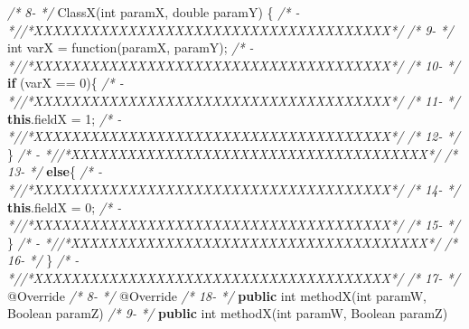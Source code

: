 \documentclass[
]{article}
\newenvironment{Shaded}{\begin{snugshade}}{\end{snugshade}}
\newcommand{\AttributeTok}[1]{\textcolor[rgb]{0.77,0.63,0.00}{#1}}
\newcommand{\BuiltInTok}[1]{#1}
\newcommand{\CommentTok}[1]{\textcolor[rgb]{0.56,0.35,0.01}{\textit{#1}}}
\newcommand{\DataTypeTok}[1]{\textcolor[rgb]{0.13,0.29,0.53}{#1}}
\newcommand{\DecValTok}[1]{\textcolor[rgb]{0.00,0.00,0.81}{#1}}
\newcommand{\FunctionTok}[1]{\textcolor[rgb]{0.00,0.00,0.00}{#1}}
\newcommand{\KeywordTok}[1]{\textcolor[rgb]{0.13,0.29,0.53}{\textbf{#1}}}
\newcommand{\NormalTok}[1]{#1}
\begin{document}
\begin{landscape}
\begin{Shaded}
\begin{Highlighting}[]
\CommentTok{/*  8-                 */}    \FunctionTok{ClassX}\NormalTok{(}\DataTypeTok{int}\NormalTok{ paramX, }\DataTypeTok{double}\NormalTok{ paramY) \{                                }\CommentTok{/*   -                 *//*XXXXXXXXXXXXXXXXXXXXXXXXXXXXXXXXXXXXXX*/}                     
\CommentTok{/*  9-                 */}        \DataTypeTok{int}\NormalTok{ varX = }\FunctionTok{function}\NormalTok{(paramX, paramY);                          }\CommentTok{/*   -                 *//*XXXXXXXXXXXXXXXXXXXXXXXXXXXXXXXXXXXXXX*/}                     
\CommentTok{/* 10-                 */}        \KeywordTok{if}\NormalTok{ (varX == }\DecValTok{0}\NormalTok{)\{                                        }\CommentTok{/*   -                 *//*XXXXXXXXXXXXXXXXXXXXXXXXXXXXXXXXXXXXXX*/}                     
\CommentTok{/* 11-                 */}            \KeywordTok{this}\NormalTok{.}\FunctionTok{fieldX}\NormalTok{ = }\DecValTok{1}\NormalTok{;                                   }\CommentTok{/*   -                 *//*XXXXXXXXXXXXXXXXXXXXXXXXXXXXXXXXXXXXXX*/}                     
\CommentTok{/* 12-                 */}\NormalTok{        \}                                                      }\CommentTok{/*   -                 *//*XXXXXXXXXXXXXXXXXXXXXXXXXXXXXXXXXXXXXX*/}                     
\CommentTok{/* 13-                 */}        \KeywordTok{else}\NormalTok{\{                                                  }\CommentTok{/*   -                 *//*XXXXXXXXXXXXXXXXXXXXXXXXXXXXXXXXXXXXXX*/}                     
\CommentTok{/* 14-                 */}            \KeywordTok{this}\NormalTok{.}\FunctionTok{fieldX}\NormalTok{ = }\DecValTok{0}\NormalTok{;                                   }\CommentTok{/*   -                 *//*XXXXXXXXXXXXXXXXXXXXXXXXXXXXXXXXXXXXXX*/}                     
\CommentTok{/* 15-                 */}\NormalTok{        \}                                                      }\CommentTok{/*   -                 *//*XXXXXXXXXXXXXXXXXXXXXXXXXXXXXXXXXXXXXX*/}                     
\CommentTok{/* 16-                 */}\NormalTok{    \}                                                          }\CommentTok{/*   -                 *//*XXXXXXXXXXXXXXXXXXXXXXXXXXXXXXXXXXXXXX*/}                     
\CommentTok{/* 17-                 */}    \AttributeTok{@Override}                                                  \CommentTok{/*  8-                 */}    \AttributeTok{@Override}                                                  
\CommentTok{/* 18-                 */}    \KeywordTok{public} \DataTypeTok{int} \FunctionTok{methodX}\NormalTok{(}\DataTypeTok{int}\NormalTok{ paramW, }\BuiltInTok{Boolean}\NormalTok{ paramZ)             }\CommentTok{/*  9-                 */}    \KeywordTok{public} \DataTypeTok{int} \FunctionTok{methodX}\NormalTok{(}\DataTypeTok{int}\NormalTok{ paramW, }\BuiltInTok{Boolean}\NormalTok{ paramZ)             }

\end{Highlighting}
\end{Shaded}
\end{landscape}
\end{document}
